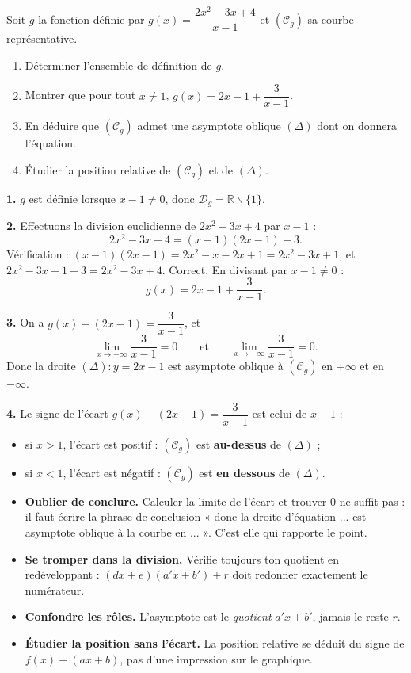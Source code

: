 \documentclass[11pt]{article}
\def\setminus{\mathbin{\backslash}}\let\smallsetminus\setminus
\begin{document}
\begin{exoresolu}
Soit $g$ la fonction définie par $g(x) = \dfrac{2x^2 - 3x + 4}{x - 1}$ et $(\mathcal{C}_g)$ sa courbe représentative.
\begin{enumerate}
\item Déterminer l'ensemble de définition de $g$.
\item Montrer que pour tout $x \neq 1$, $g(x) = 2x - 1 + \dfrac{3}{x-1}$.
\item En déduire que $(\mathcal{C}_g)$ admet une asymptote oblique $(\Delta)$ dont on donnera l'équation.
\item Étudier la position relative de $(\mathcal{C}_g)$ et de $(\Delta)$.
\end{enumerate}
\tcblower
\textbf{1.} $g$ est définie lorsque $x - 1 \neq 0$, donc $\mathcal{D}_g = \mathbb{R} \setminus \{1\}$.

\textbf{2.} Effectuons la division euclidienne de $2x^2 - 3x + 4$ par $x - 1$ :
\[
2x^2 - 3x + 4 = (x-1)(2x - 1) + 3.
\]
Vérification : $(x-1)(2x-1) = 2x^2 - x - 2x + 1 = 2x^2 - 3x + 1$, et $2x^2 - 3x + 1 + 3 = 2x^2 - 3x + 4$. Correct. En divisant par $x-1 \neq 0$ :
\[
g(x) = 2x - 1 + \frac{3}{x-1}.
\]

\textbf{3.} On a $g(x) - (2x-1) = \dfrac{3}{x-1}$, et
\[
\lim_{x \to +\infty} \frac{3}{x-1} = 0 \qquad \text{et} \qquad \lim_{x \to -\infty} \frac{3}{x-1} = 0.
\]
Donc la droite $(\Delta) : y = 2x - 1$ est asymptote oblique à $(\mathcal{C}_g)$ en $+\infty$ et en $-\infty$.

\textbf{4.} Le signe de l'écart $g(x) - (2x-1) = \dfrac{3}{x-1}$ est celui de $x-1$ :
\begin{itemize}
\item si $x > 1$, l'écart est positif : $(\mathcal{C}_g)$ est \textbf{au-dessus} de $(\Delta)$ ;
\item si $x < 1$, l'écart est négatif : $(\mathcal{C}_g)$ est \textbf{en dessous} de $(\Delta)$.
\end{itemize}
\end{exoresolu}

\begin{attention}
\begin{itemize}
\item \textbf{Oublier de conclure.} Calculer la limite de l'écart et trouver $0$ ne suffit pas : il faut écrire la phrase de conclusion « donc la droite d'équation ... est asymptote oblique à la courbe en ... ». C'est elle qui rapporte le point.
\item \textbf{Se tromper dans la division.} Vérifie toujours ton quotient en redéveloppant : $(dx+e)(a'x+b') + r$ doit redonner exactement le numérateur.
\item \textbf{Confondre les rôles.} L'asymptote est le \emph{quotient} $a'x + b'$, jamais le reste $r$.
\item \textbf{Étudier la position sans l'écart.} La position relative se déduit du signe de $f(x) - (ax+b)$, pas d'une impression sur le graphique.
\end{itemize}
\end{attention}
\end{document}
